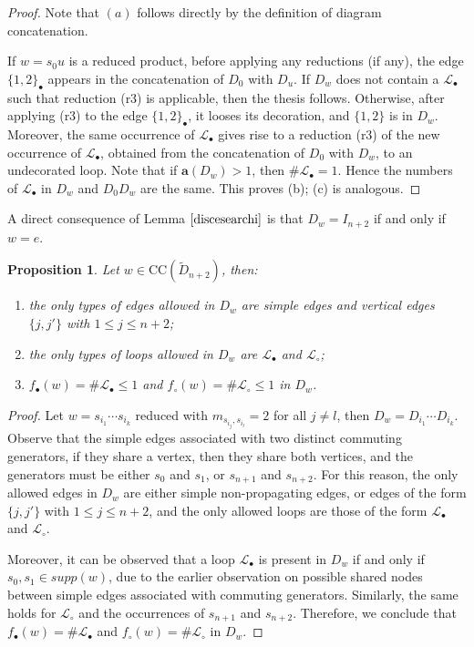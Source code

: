 \documentclass{amsart}
\newcommand{\D}{{\widetilde{D}_{n+2}}}
\newcommand{\bO}{{\mathcal{L}_{\bullet}}}
\newcommand{\wO}{{\mathcal{L}_{\circ}}}
\newcommand{\TTC}{\mathrm{CC}}
\newtheorem{Proposition}[Theorem]{Proposition}
\theoremstyle{definition}
\begin{document}
\begin{proof}
Note that $(a)$ follows directly by the definition of diagram concatenation. 

If $w=s_0u$ is a reduced product, before applying any reductions (if any), the edge $\{1,2\}_\bullet$ appears in the concatenation of $D_0$ with $D_u$. If $D_w$ does not contain a $\bO$ such that reduction (r3) is applicable, then the thesis follows. Otherwise, after applying (r3) to the edge $\{1,2\}_\bullet$, it looses its decoration, and $\{1,2\}$ is in $D_w$. Moreover, the same occurrence of $\bO$ gives rise to a reduction (r3) of the new occurrence of $\bO$, obtained from the concatenation of $D_0$ with $D_w$, to an undecorated loop. Note that if $\mathbf{a}(D_w)>1$, then $\# \bO=1$. Hence the numbers of $\bO$ in $D_w$ and $D_{0}D_{w}$ are the same. This proves (b); (c) is analogous.
\end{proof}

A direct consequence of Lemma $\ref{discesearchi}$ is that $D_w=I_{n+2}$ if and only if $w=e$.


\begin{Proposition}
\label{diagrammiasscomm}
Let $w\in \TTC(\D)$, then:
\begin{enumerate}
    \item[(a)] the only types of edges allowed in $D_w$ are simple edges and vertical edges $\{j,j'\}$ with $1\le j \le n+2$;
    \item[(b)] the only types of loops allowed in $D_w$ are $\bO$ and $\wO$;
    \item[(c)] $f_\bullet(w)=\# \bO\le 1$ and $f_\circ(w)=\# \wO \le 1$ in $D_{w}$.
\end{enumerate}
\end{Proposition}

\begin{proof}
Let $w = s_{i_1} \cdots s_{i_k}$ reduced with $ m_{s_{i_j}, s_{i_l}} = 2 $ for all $ j \ne l $, then $D_w = D_{i_1} \cdots D_{i_k}$. Observe that the simple edges associated with two distinct commuting generators, if they share a vertex, then they share both vertices, and the generators must be either $ s_0 $ and $ s_1 $, or $ s_{n+1} $ and $ s_{n+2} $. For this reason, the only allowed edges in $ D_w $ are either simple non-propagating edges, or edges of the form $ \{j, j'\} $ with $ 1 \le j \le n+2 $, and the only allowed loops are those of the form $ \bO $ and $ \wO $.

Moreover, it can be observed that a loop $ \bO $ is present in $ D_w $ if and only if $ s_0, s_1 \in supp(w) $, due to the earlier observation on possible shared nodes between simple edges associated with commuting generators. Similarly, the same holds for $ \wO $ and the occurrences of $ s_{n+1} $ and $ s_{n+2} $. Therefore, we conclude that $f_\bullet(w) = \# \bO$ and $f_\circ(w) = \# \wO$ in $ D_w $.

\end{proof}
\end{document}
